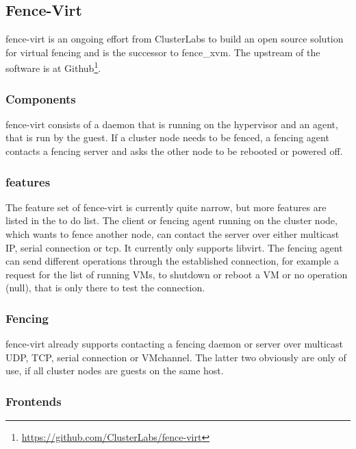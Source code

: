\subsection{Fence-Virt}
fence-virt is an ongoing effort from ClusterLabs to build an open source solution
for virtual fencing and is the successor to fence\_xvm. 
The upstream of the software is at Github\footnote{\url{https://github.com/ClusterLabs/fence-virt}}.

\subsubsection{Components}
fence-virt consists of a daemon that is running on the hypervisor and 
an agent, that is run by the guest. If a cluster node needs to be fenced,
a fencing agent contacts a fencing server and asks the other node to
be rebooted or powered off.

\subsubsection{features}
The feature set of fence-virt is currently quite narrow, but more features are listed
in the to do list.
The client or fencing agent running on the cluster node, which wants to fence
another node, can contact the server over either multicast IP, serial connection or
tcp. It currently only supports libvirt.
The fencing agent can send different operations through the established connection,
for example a request for the list of running \acp{VM}, to shutdown or reboot a \ac{VM}
or no operation (null), that is only there to test the connection.

\subsubsection{Fencing}
fence-virt already supports contacting a fencing daemon or server over
multicast UDP, TCP, serial connection or VMchannel. The latter two obviously are only
of use, if all cluster nodes are guests on the same host.

\subsubsection{Frontends}
